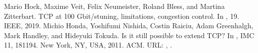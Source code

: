 \documentclass[letterpaper,10pt,english]{sphinxmanual}
\begin{document}
\begin{sphinxthebibliography}{10}
\sphinxAtStartPar
Mario Hock, Maxime Veit, Felix Neumeister, Roland Bless, and Martina Zitterbart. TCP at 100 Gbit/s\textendash{}tuning, limitations, congestion control. In , 1\textendash{}9. IEEE, 2019.
\sphinxAtStartPar
Michio Honda, Yoshifumi Nishida, Costin Raiciu, Adam Greenhalgh, Mark Handley, and Hideyuki Tokuda. Is it still possible to extend TCP? In , IMC \textquotesingle{}11, 181\textendash{}194. New York, NY, USA, 2011. ACM. URL: , .
\end{sphinxthebibliography}



\renewcommand{\indexname}{Index}
\printindex
\end{document}
